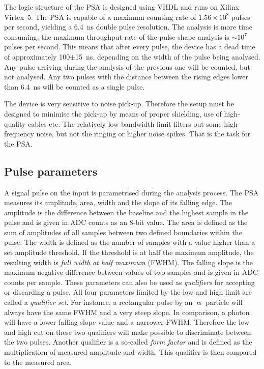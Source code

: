 \documentclass[12pt]{mytustyle}  %
\begin{document}
The logic structure of the PSA is designed using VHDL and runs on Xilinx Virtex~5. The PSA is capable of a maximum counting rate of $1.56\times10^8$ pulses per second, yielding a 6.4~ns double pulse resolution. The analysis is more time consuming; the maximum throughput rate of the pulse shape analysis is $\sim10^7$ pulses per second. This means that after every pulse, the device has a dead time of approximately 100$\pm$15~ns, depending on the width of the pulse being analysed. Any pulse arriving during the analysis of the previous one will be counted, but not analysed. Any two pulses with the distance between the rising edges lower than 6.4~ns will be counted as a single pulse.

The device is very sensitive to noise pick-up. Therefore the setup must be designed to minimise the pick-up by means of proper shielding, use of high-quality cables etc. The relatively low bandwidth limit filters out some high-frequency noise, but not the ringing or higher noise spikes. That is the task for the PSA.

\subsection{Pulse parameters}
A signal pulse on the input is parametrised during the analysis process. The PSA measures its amplitude, area, width and the slope of its falling edge. The amplitude is the difference between the baseline and the highest sample in the pulse and is given in ADC counts as an 8-bit value. The area is defined as the sum of amplitudes of all samples between two defined boundaries within the pulse. The width is defined as the number of samples with a value higher than a set amplitude threshold. If the threshold is at half the maximum amplitude, the resulting width is \emph{full width at half maximum} (FWHM). The falling slope is the maximum negative difference between values of two samples and is given in ADC counts per sample. These parameters can also be used as \emph{qualifiers} for accepting or discarding a pulse. All four parameters limited by the low and high limit are called a \emph{qualifier set}. For instance, a rectangular pulse by an $\upalpha$ particle will always have the same FWHM and a very steep slope. In comparison, a photon will have a lower falling slope value and a narrower FWHM. Therefore the low and high cut on these two qualifiers will make possible to discriminate between the two pulses. Another qualifier is a so-called \emph{form factor} and is defined as the multiplication of measured amplitude and width. This qualifier is then compared to the measured area.
\end{document}
